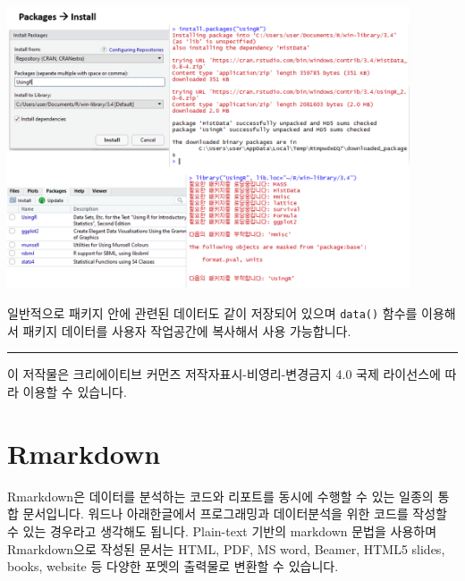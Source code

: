 \documentclass[
]{book}
\newenvironment{Shaded}{\begin{snugshade}}{\end{snugshade}}
\newcommand{\AttributeTok}[1]{\textcolor[rgb]{0.77,0.63,0.00}{#1}}
\newcommand{\FunctionTok}[1]{\textcolor[rgb]{0.00,0.00,0.00}{#1}}
\newcommand{\NormalTok}[1]{#1}
\newcommand{\SpecialCharTok}[1]{\textcolor[rgb]{0.00,0.00,0.00}{#1}}
\newcommand{\StringTok}[1]{\textcolor[rgb]{0.31,0.60,0.02}{#1}}
\begin{document}
\includegraphics[width=4.6875in,height=\textheight]{images/01/01-19.PNG}

일반적으로 패키지 안에 관련된 데이터도 같이 저장되어 있으며 \texttt{data()} 함수를 이용해서 패키지 데이터를 사용자 작업공간에 복사해서 사용 가능합니다.

\begin{Shaded}
\end{Shaded}

\begin{center}\rule{0.5\linewidth}{0.5pt}\end{center}

이 저작물은 크리에이티브 커먼즈 저작자표시-비영리-변경금지 4.0 국제 라이선스에 따라 이용할 수 있습니다.

\hypertarget{rmarkdown}{%
\chapter{Rmarkdown}\label{rmarkdown}}

Rmarkdown은 데이터를 분석하는 코드와 리포트를 동시에 수행할 수 있는 일종의 통합 문서입니다. 워드나 아래한글에서 프로그래밍과 데이터분석을 위한 코드를 작성할 수 있는 경우라고 생각해도 됩니다. Plain-text 기반의 markdown 문법을 사용하며 Rmarkdown으로 작성된 문서는 HTML, PDF, MS word, Beamer, HTML5 slides, books, website 등 다양한 포멧의 출력물로 변환할 수 있습니다.
\end{document}
